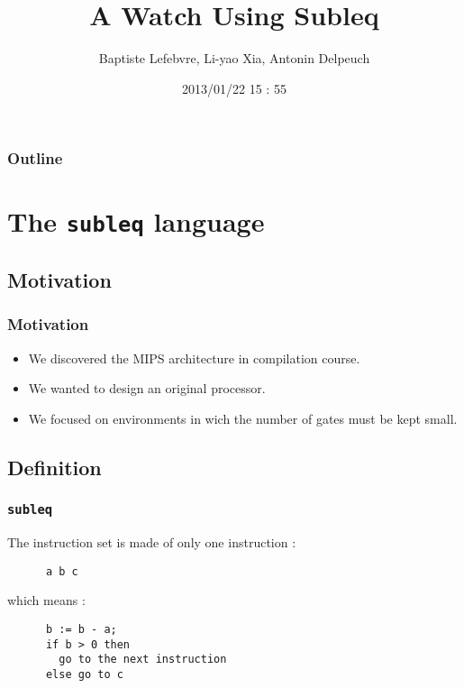 \documentclass[slidestop]{beamer}
\begin{document}
\makeatletter

\title{A Watch Using Subleq}
\author{Baptiste Lefebvre, Li-yao Xia, Antonin Delpeuch}
\date{2013/01/22 15 : 55}

\begin{frame}
    \maketitle
\end{frame}

\begin{frame}
    \frametitle{Outline}
    \tableofcontents
\end{frame}
\section{The \texttt{subleq} language}
\subsection{Motivation}

\begin{frame}
    \frametitle{Motivation}

    \begin{itemize}
        \item We discovered the MIPS architecture in compilation course.
        \item We wanted to design an original processor.
        \item We focused on environments in wich the number of gates must be kept small.
    \end{itemize}

\end{frame}

\subsection{Definition}
\begin{frame}[fragile]
    \frametitle{\texttt{subleq}}

    The instruction set is made of only one instruction :
    \\[11pt]
    \begin{lstlisting}
      a b c
    \end{lstlisting}
    which means :

    \begin{lstlisting}
      b := b - a;
      if b > 0 then
        go to the next instruction
      else go to c
    \end{lstlisting}

\end{frame}
\end{document}
